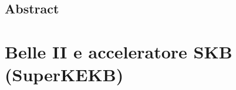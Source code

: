 \documentclass[10pt,a4paper,twoside]{report}
\begin{document}
\doublespacing
\tableofcontents
\singlespacing


\begin{comment}
\begin{frontespizio}
\Universita{Pisa}
\Logo[scale=.1]{logo}
\Dipartimento{Fisica}
\Corso{Fisica delle Interazioni Fondamentali}
\Titolo{Studio di rivelatori a pixel monolitici CMOS per l'upgrade dell'esperimento Belle II}
\Candidato{Mara Stefania Calo'}
\Relatore{prof. Francesco Forti}
\Annoaccademico{2022.2023}
\end{frontespizio}
\end{comment}

\newpage

\section*{Abstract}

\begin{comment}
Belle II è un esperimento di fisica delle particelle situato a Tsukuba, in Giappone, nel laboratorio (di) KEK (100 km da Tokyo). E' una flavor-factory di seconda generazione che opera alla frontiera dell'intensità, detenendo il record mondiale di maggiore luminosità. L'acceleratore SuperKEKB è un collider di fasci $e^{+}$ $e^{-}$ con energie asimmetriche e piccate alla risonanza $\Upsilon$(4S). Auspica a raccogliere un set di dati fino a 50 $ab^{-1}$ (x50 Belle dataset, x100 BaBar dataset) per studiare la violazione di CP nei mesoni B e ricerca nuova fisica oltre il Modello Standard.
\end{comment}


\chapter{Belle II e acceleratore SKB (SuperKEKB)}

\begin{comment}
Belle II è un esperimento general-purpose utilizzato nello studio dei parametri del Modello Standard (MS) e nella ricerca di Fisica oltre il MS (Beyond Standard Model, BSM).
In particolare l'esperimento studia la violazione di CP nei sistemi di mesoni B e cerca evidenze di Nuova Fisica (New Physic, NP) nei decadimenti dei mesoni B, dei mesoni D, nei leptoni $\tau$ e nel dark sector (settore della materia oscura), in particolare dei fotoni oscuri.
\end{comment}
\end{document}
